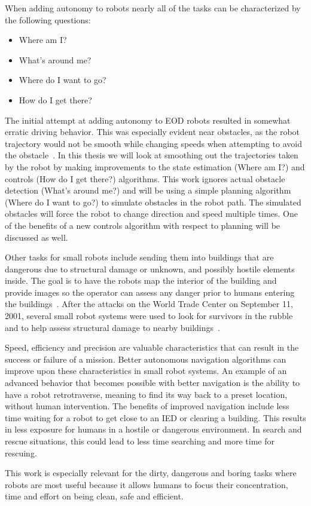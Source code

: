 When adding autonomy to robots nearly all of the tasks can be characterized by the following questions:
\begin{itemize}
\item Where am I\@?
\item What's around me?
\item Where do I want to go?
\item How do I get there?
\end{itemize}

The initial attempt at adding autonomy to EOD robots resulted in somewhat erratic driving behavior. This was especially evident near obstacles, as the robot trajectory would not be smooth while changing speeds when attempting to avoid the obstacle~\cite{Bruch00}. In this thesis we will look at smoothing out the trajectories taken by the robot by making improvements to the state estimation (Where am I?) and controls (How do I get there?) algorithms. This work ignores actual obstacle detection (What's around me?) and will be using a simple planning algorithm (Where do I want to go?) to simulate obstacles in the robot path. The simulated obstacles will force the robot to change direction and speed multiple times. One of the benefits of a new controls algorithm with respect to planning will be discussed as well.

Other tasks for small robots include sending them into buildings that are dangerous due to structural damage or unknown, and possibly hostile elements inside. The goal is to have the robots map the interior of the building and provide images so the operator can assess any danger prior to humans entering the buildings~\cite{CongressUGV06}. After the attacks on the World Trade Center on September 11, 2001, several small robot systems were used to look for survivors in the rubble and to help assess structural damage to nearby buildings~\cite{Everett02}.

Speed, efficiency and precision are valuable characteristics that can result in the success or failure of a mission. Better autonomous navigation algorithms can improve upon these characteristics in small robot systems. An example of an advanced behavior that becomes possible with better navigation is the ability to have a robot retrotraverse, meaning to find its way back to a preset location, without human intervention. The benefits of improved navigation include less time waiting for a robot to get close to an IED or clearing a building. This results in less exposure for humans in a hostile or dangerous environment. In search and rescue situations, this could lead to less time searching and more time for rescuing.

This work is especially relevant for the dirty, dangerous and boring tasks where robots are most useful because it allows humans to focus their concentration, time and effort on being clean, safe and efficient.
